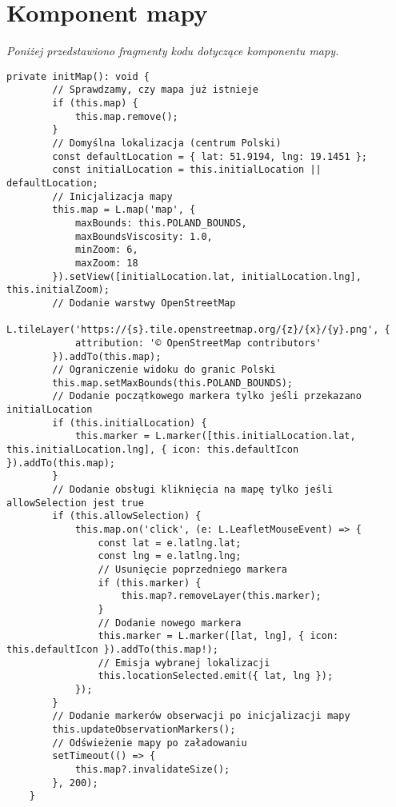 %

\chapter{Komponent mapy}
\label{chapter:dodatek_C}

\textit{Poniżej przedstawiono fragmenty kodu dotyczące komponentu mapy.}

\begin{lstlisting}[style=tsstyle, caption={Inicjalizacja},label={lst:inicjalizacjamapy}]
	private initMap(): void {
		// Sprawdzamy, czy mapa już istnieje
		if (this.map) {
			this.map.remove();
		}
		// Domyślna lokalizacja (centrum Polski)
		const defaultLocation = { lat: 51.9194, lng: 19.1451 };
		const initialLocation = this.initialLocation || defaultLocation;
		// Inicjalizacja mapy
		this.map = L.map('map', {
			maxBounds: this.POLAND_BOUNDS,
			maxBoundsViscosity: 1.0,
			minZoom: 6,
			maxZoom: 18
		}).setView([initialLocation.lat, initialLocation.lng], this.initialZoom);
		// Dodanie warstwy OpenStreetMap
		L.tileLayer('https://{s}.tile.openstreetmap.org/{z}/{x}/{y}.png', {
			attribution: '© OpenStreetMap contributors'
		}).addTo(this.map);
		// Ograniczenie widoku do granic Polski
		this.map.setMaxBounds(this.POLAND_BOUNDS);
		// Dodanie początkowego markera tylko jeśli przekazano initialLocation
		if (this.initialLocation) {
			this.marker = L.marker([this.initialLocation.lat, this.initialLocation.lng], { icon: this.defaultIcon }).addTo(this.map);
		}
		// Dodanie obsługi kliknięcia na mapę tylko jeśli allowSelection jest true
		if (this.allowSelection) {
			this.map.on('click', (e: L.LeafletMouseEvent) => {
				const lat = e.latlng.lat;
				const lng = e.latlng.lng;
				// Usunięcie poprzedniego markera
				if (this.marker) {
					this.map?.removeLayer(this.marker);
				}
				// Dodanie nowego markera
				this.marker = L.marker([lat, lng], { icon: this.defaultIcon }).addTo(this.map!);
				// Emisja wybranej lokalizacji
				this.locationSelected.emit({ lat, lng });
			});
		}
		// Dodanie markerów obserwacji po inicjalizacji mapy
		this.updateObservationMarkers();
		// Odświeżenie mapy po załadowaniu
		setTimeout(() => {
			this.map?.invalidateSize();
		}, 200);
	}
\end{lstlisting}

